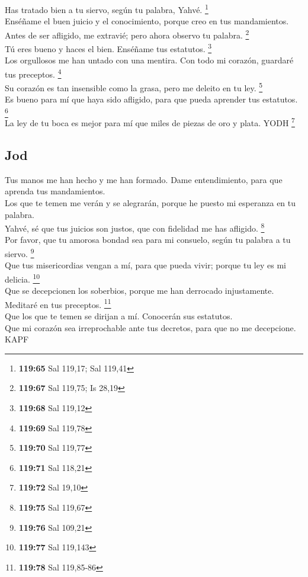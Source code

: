  Has tratado bien a tu siervo, según tu palabra, Yahvé.
\footnote{\textbf{119:65} Sal 119,17; Sal 119,41}\\
 Enséñame el buen juicio y el conocimiento, porque creo
en tus mandamientos.\\
 Antes de ser afligido, me extravié; pero ahora observo
tu palabra. \footnote{\textbf{119:67} Sal 119,75; Is 28,19}\\
 Tú eres bueno y haces el bien. Enséñame tus estatutos.
\footnote{\textbf{119:68} Sal 119,12}\\
 Los orgullosos me han untado con una mentira. Con todo
mi corazón, guardaré tus preceptos. \footnote{\textbf{119:69} Sal 119,78}\\
 Su corazón es tan insensible como la grasa, pero me
deleito en tu ley. \footnote{\textbf{119:70} Sal 119,77}\\
 Es bueno para mí que haya sido afligido, para que pueda
aprender tus estatutos. \footnote{\textbf{119:71} Sal 118,21}\\
 La ley de tu boca es mejor para mí que miles de piezas
de oro y plata. YODH \footnote{\textbf{119:72} Sal 19,10}

\hypertarget{jod}{%
\subsection{Jod}\label{jod}}

 Tus manos me han hecho y me han formado. Dame
entendimiento, para que aprenda tus mandamientos.\\
 Los que te temen me verán y se alegrarán, porque he
puesto mi esperanza en tu palabra.\\
 Yahvé, sé que tus juicios son justos, que con fidelidad
me has afligido. \footnote{\textbf{119:75} Sal 119,67}\\
 Por favor, que tu amorosa bondad sea para mi consuelo,
según tu palabra a tu siervo. \footnote{\textbf{119:76} Sal 109,21}\\
 Que tus misericordias vengan a mí, para que pueda vivir;
porque tu ley es mi delicia. \footnote{\textbf{119:77} Sal 119,143}\\
 Que se decepcionen los soberbios, porque me han
derrocado injustamente. Meditaré en tus preceptos. \footnote{\textbf{119:78}
  Sal 119,85-86}\\
 Que los que te temen se dirijan a mí. Conocerán sus
estatutos.\\
 Que mi corazón sea irreprochable ante tus decretos, para
que no me decepcione. KAPF

